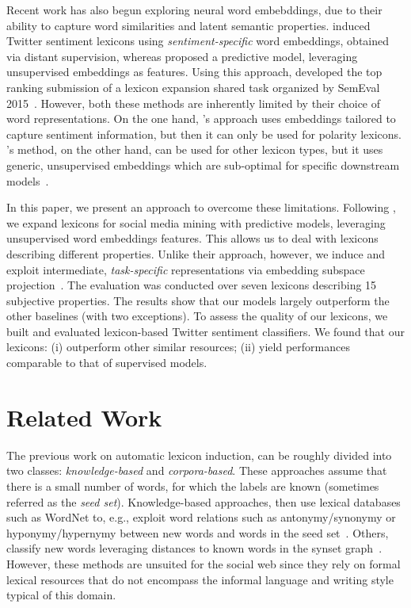 \documentclass[letterpaper]{article}
\newcommand{\newcite}[1]{\citeauthor{#1} \shortcite{#1}}
\begin{document}
Recent work has also begun exploring neural word embebddings, due to their ability to capture word similarities and latent semantic properties. \newcite{tang-EtAl2014} induced Twitter sentiment lexicons using \textit{sentiment-specific} word embeddings, obtained via distant supervision, whereas \newcite{Amir} proposed a predictive model, leveraging unsupervised embeddings as features. Using this approach, \citeauthor{Amir} developed the top ranking submission of a lexicon expansion shared task organized by SemEval 2015~\cite{SemEval15Task10}. However, both these methods are inherently limited by their choice of word representations. On the one hand, \citeauthor{tang-EtAl2014}'s approach uses embeddings tailored to capture sentiment information, but then it can only be used for polarity lexicons. \citeauthor{Amir}'s method, on the other hand, can be used for other lexicon types, but it uses generic, unsupervised embeddings which are sub-optimal for specific downstream models~\cite{astudillo-EtAl:2015:ACL-IJCNLP,labutov2013re}. 

In this paper, we present an approach to overcome these limitations. Following \citeauthor{Amir}, we expand lexicons for social media mining with predictive models, leveraging unsupervised word embeddings features. This allows us to deal with lexicons describing different properties. Unlike their approach, however, we induce and exploit intermediate, \textit{task-specific} representations via embedding subspace projection~\cite{astudillo-EtAl:2015:ACL-IJCNLP}. The evaluation was conducted over seven lexicons describing 15 subjective properties. The results show that our models largely outperform the other baselines (with two exceptions). To assess the quality of our lexicons, we built and evaluated lexicon-based Twitter sentiment classifiers. We found that our lexicons: (i) outperform other similar resources; (ii) yield performances comparable to that of supervised models.

\section{Related Work}
\label{sec:related}

The previous work on automatic lexicon induction, can be roughly divided into two classes: \textit{knowledge-based} and \textit{corpora-based}. These approaches assume that there is a small number of words, for which the labels are known (sometimes referred as the \textit{seed set}). Knowledge-based approaches, then use lexical databases such as WordNet to, e.g., exploit word relations such as antonymy/synonymy or hyponymy/hypernymy between new words and words in the seed set~\cite{hu2004mining,kim2006identifying,rao2009semi}. Others, classify new words leveraging distances to known words in the synset graph~\cite{kamps2004using}. However, these methods are unsuited for the social web since they rely on formal lexical resources that do not encompass the informal language and writing style typical of this domain. 
\end{document}
